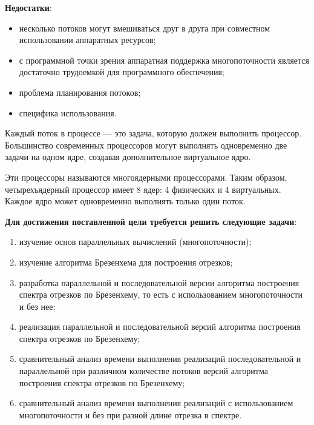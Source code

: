 \textbf{Недостатки}:
\begin{itemize}
	\item несколько потоков могут вмешиваться друг в друга при совместном использовании аппаратных ресурсов;
	\item с программной точки зрения аппаратная поддержка многопоточности является достаточно трудоемкой для программного обеспечения;
	\item проблема планирования потоков;
	\item специфика использования. 
\end{itemize}

Каждый поток в процессе --- это задача, которую должен выполнить процессор. Большинство современных процессоров могут выполнять одновременно две задачи на одном ядре, создавая дополнительное виртуальное ядро. 

Эти процессоры называются многоядерными процессорами. Таким образом, четырехъядерный процессор имеет 8 ядер: 4 физических и 4 виртуальных. Каждое ядро может одновременно выполнять только один поток.


\textbf{Для достижения поставленной цели требуется решить следующие задачи}:
\begin{enumerate}[label={\arabic*)}]
	\item изучение основ параллельных вычислений (многопоточности);
	\item изучение алгоритма Брезенхема для построения отрезков;
	\item разработка параллельной и последовательной версии алгоритма построения спектра отрезков по Брезенхему, то есть с использованием многопоточности и без нее;
	\item реализация параллельной и последовательной версий алгоритма построения спектра отрезков по Брезенхему;
    \item сравнительный анализ времени выполнения реализаций последовательной и параллельной при различном количестве потоков версий алгоритма построения спектра отрезков по Брезенхему;
    \item сравнительный анализ времени выполнения реализаций с использованием многопоточности и без при разной длине отрезка в спектре.
\end{enumerate}